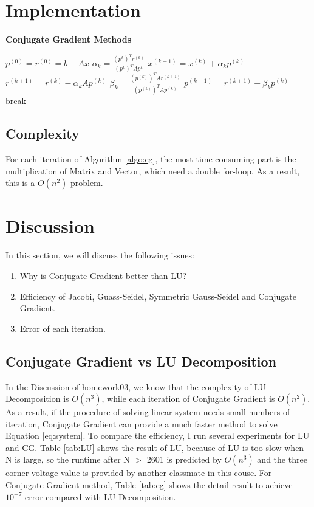 \documentclass{article}
\begin{document}
\section{Implementation}
\begin{algorithm}[H]
    \caption{\textbf{Conjugate Gradient Methods}}
    \label{algo:cg}
    \begin{algorithmic}
        \State $p^{(0)} = r^{(0)} = b - Ax$
            \State $\alpha_k = \frac{(p^{k})^Tr^{(k)}}{(p^{k})^TAp^{k}}$
            \State $x^{(k+1)} = x^{(k)} + \alpha_kp^{(k)}$
            \State $r^{(k+1)} = r^{(k)} - \alpha_kAp^{(k)}$
            \State $\beta_k = \frac{(p^{(k)})^TAr^{(k+1)}}{(p^{(k)})^TAp^{(k)}}$
            \State $p^{(k+1)} = r^{(k+1)} - \beta_kp^{(k)}$
                \State break
            \EndIf
        \EndFor
    \end{algorithmic}
\end{algorithm}
\subsection{Complexity}
\label{sec:complexity}
For each iteration of Algorithm \ref{algo:cg}, the most time-consuming part is the multiplication of Matrix and Vector, which need a double for-loop.
As a result, this is a {\boldmath$O(n^2)$} problem.

\section{Discussion}
In this section, we will discuss the following issues:
\begin{enumerate}
    \item Why is Conjugate Gradient better than LU?
    \item Efficiency of Jacobi, Guass-Seidel, Symmetric Gauss-Seidel and Conjugate Gradient.
    \item Error of each iteration.
\end{enumerate}

\subsection{Conjugate Gradient vs LU Decomposition}
\label{sec:cg vs lu}
In the Discussion of homework03, we know that the complexity of LU Decomposition is $O(n^3)$, while each iteration of Conjugate Gradient is $O(n^2)$.
As a result, if the procedure of solving linear system needs small numbers of iteration, Conjugate Gradient can provide a much faster method to
solve Equation \ref{eq:system}. \newline
To compare the efficiency, I run several experiments for LU and CG. Table \ref{tab:LU} shows the result of LU, because of LU is too slow when N is
large, so the runtime after N $>$ 2601 is predicted by $O(n^3)$ and the three corner voltage value is provided by another classmate in this couse.
For Conjugate Gradient method, Table \ref{tab:cg} shows the detail result to achieve $10^{-7}$ error compared with LU Decomposition.
\end{document}

